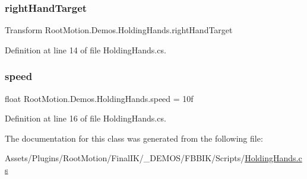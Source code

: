 \subsubsection{\texorpdfstring{right\+Hand\+Target}{rightHandTarget}}
{\footnotesize\ttfamily Transform Root\+Motion.\+Demos.\+Holding\+Hands.\+right\+Hand\+Target}



Definition at line 14 of file Holding\+Hands.\+cs.

\mbox{\label{class_root_motion_1_1_demos_1_1_holding_hands_a52296d2e735ce4ac1ad7dadf4be3462a}} 
\subsubsection{\texorpdfstring{speed}{speed}}
{\footnotesize\ttfamily float Root\+Motion.\+Demos.\+Holding\+Hands.\+speed = 10f}



Definition at line 16 of file Holding\+Hands.\+cs.



The documentation for this class was generated from the following file\+:\begin{DoxyCompactItemize}
\item 
Assets/\+Plugins/\+Root\+Motion/\+Final\+I\+K/\+\_\+\+D\+E\+M\+O\+S/\+F\+B\+B\+I\+K/\+Scripts/\mbox{\hyperlink{_holding_hands_8cs}{Holding\+Hands.\+cs}}\end{DoxyCompactItemize}
